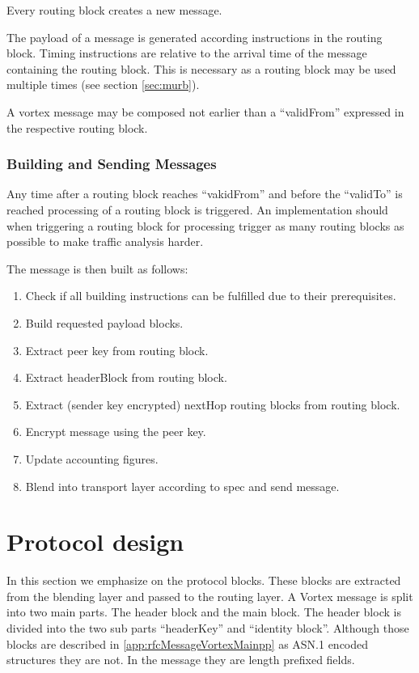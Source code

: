 Every routing block creates a new message.

The payload of a message is generated according instructions in the routing block. Timing instructions are relative to the arrival time of the message containing the routing block. This is necessary as a routing block may be used multiple times (see section \ref{sec:murb}).

A vortex message may be composed not earlier than a ``validFrom'' expressed in the respective routing block.

\subsubsection{Building and Sending Messages}
Any time after a routing block reaches ``vakidFrom'' and before the ``validTo'' is reached processing of a routing block is triggered. An implementation should when triggering a routing block for processing trigger as many routing blocks as possible to make traffic analysis harder.

The message is then built as follows:
\begin{enumerate}
	\item Check if all building instructions can be fulfilled due to their prerequisites.
	\item Build requested payload blocks.
	\item Extract peer key from routing block.
	\item Extract headerBlock from routing block.
	\item Extract (sender key encrypted) nextHop routing blocks from routing block.
	\item Encrypt message using the peer key.
	\item Update accounting figures.
	\item Blend into transport layer according to spec and send message.
\end{enumerate}

\section{Protocol design}
In this section we emphasize on the protocol blocks. These blocks are extracted from the blending layer and passed to the routing layer. A Vortex message is split into two main parts. The header block and the main block. The header block is divided into the two sub parts ``headerKey'' and ``identity block''. Although those blocks are described in \ref{app:rfcMessageVortexMainpp} as ASN.1 encoded structures they are not. In the message they are length prefixed fields.

